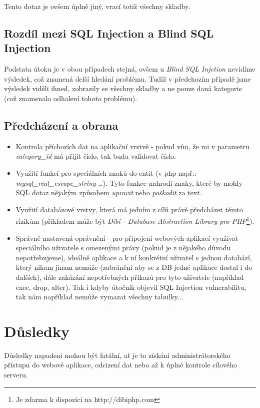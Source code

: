 \documentclass[12pt, a4paper]{report}
\begin{document}
Tento dotaz je ovšem úplně jiný, vrací totiž všechny skladby.

\section{Rozdíl mezi SQL Injection a Blind SQL Injection}
Podstata útoku je v obou případech stejná, ovšem u \textit{Blind SQL Injetion} nevidíme výsledek, což znamená delší hledání problému. Tudíž v předchozím případě jsme výsledek viděli ihned, zobrazily se všechny skladby a ne pouze daná kategorie (což znamenalo odhalení tohoto problému). 

\section{Předcházení a obrana}
\begin{itemize}
\item Kontrola příchozích dat na aplikační vrstvě - pokud vím, že mi v parametru \textit{category\_id} má přijít číslo, tak budu validovat číslo.
\item Využití funkcí pro  speciálních znaků do entit (v php např.: \textit{mysql\_real\_escape\_string} \ldots). Tyto funkce nahradí znaky, které by mohly SQL dotaz nějakým způsobem \textit{upravit} nebo \textit{poškodit} za text.
\item Využití databázové vrstvy, která má jedním z cílů právě předcházet těmto rizikům (příkladem může být \textit{Dibi - Database Abstraction Library pro PHP}\footnote{Je zdarma k dispozici na http://dibiphp.com}).
\item Správně nastavená oprávnění - pro připojení webových aplikací využívat speciálního uživatele s omezenými právy (pokud je z nějakého důvodu nepotřebujeme), ideálně aplikace a k ní konkrétní uživatel s jednou databází, který nikam jinam nemůže (zabránění aby se z DB jedné aplikace dostal i do dalších), dále zakázání nepotřebných příkazů pro tyto uživatele (například exec, drop, alter). Tak i kdyby útočník objevil SQL Injection vulnerabilitu, tak nám například nemůže vymazat všechny tabulky...
\end{itemize}

\chapter{Důsledky}
Důsledky napadení mohou být fatální, ať je to získání administrátorského přístupu do webové aplikace, odcizení dat nebo až k úplné kontrole cílového serveru.
\end{document}
